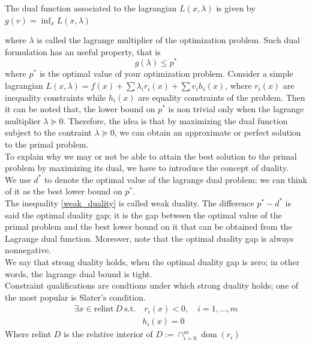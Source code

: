 \begin{definition}
    The dual function associated to the lagrangian $L(x,\lambda)$ is given by $g(v)=\inf_x L(x,\lambda)$
\end{definition}
where $\lambda$ is called the lagrange multiplier of the optimization problem. Such dual formulation has an useful property, that is \begin{equation}\label{weak_duality}
    g(\lambda)\leq p^*
\end{equation}
where $p^*$ is the optimal value of your optimization problem.
Consider a simple lagrangian $L(x,\lambda)=f(x)+\sum \lambda_i r_i(x) +\sum v_i h_i(x)$, where $r_i(x)$ are inequality constraints while $h_i(x)$ are equality constraints of the problem. Then it can be noted that, the lower bound on $p^*$ is non trivial only when the lagrange multiplier $\lambda \succeq 0$. Therefore, the idea is that by maximizing the dual function subject to the contraint $\lambda \succeq 0$, we can obtain an approximate or perfect solution to the primal problem.
\\
To explain why we may or not be able to attain the best solution to the primal problem by maximizing its dual, we have to introduce the concept of duality.
\\
We use $d^*$ to denote the optimal value of the lagrange dual problem; we can think of it as the best lower bound on $p^*$. 
\\
The inequality \ref{weak_duality} is called weak duality. The difference $p^*-d^*$ is said the optimal duality gap; it is the gap between the optimal value of the primal problem and the best lower bound on it that can be obtained from the Lagrange dual function. Moreover, note that the optimal duality gap is always nonnegative.
\\
We say that strong duality holds, when the optimal duality gap is zero; in other words, the lagrange dual bound is tight.
\\
Constraint qualifications are condtions under which strong duality holds; one of the most popular is Slater's condition.
\begin{equation}\label{slater_condition}
    \begin{aligned}
        \exists x \in \textrm{relint} \ D \ \textrm{s.t.} & \ r_i(x)<0, \quad i=1, \dots, m \\
        & h_i(x)=0
    \end{aligned}
\end{equation}
Where relint $D$ is the relative interior of $ D:=\cap _{i=0}^{m}\operatorname {dom} (r_{i})$

